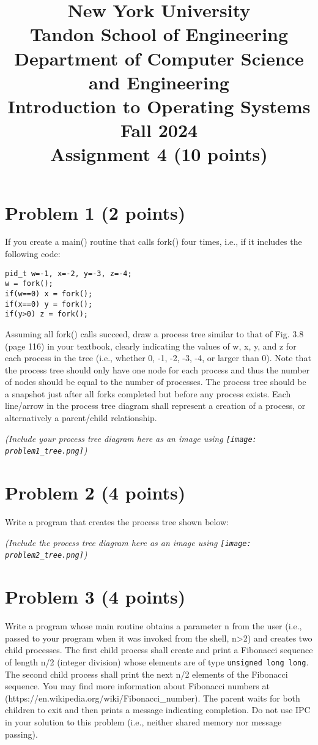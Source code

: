 \documentclass{article}
\title{New York University \\ Tandon School of Engineering \\ Department of Computer Science and Engineering \\ Introduction to Operating Systems \\ Fall 2024 \\ Assignment 4 (10 points)}
\author{ }
\date{}
\begin{document}
\maketitle

\section*{Problem 1 (2 points)}

If you create a main() routine that calls fork() four times, i.e., if it includes the following code:

\begin{verbatim}
pid_t w=-1, x=-2, y=-3, z=-4;
w = fork();
if(w==0) x = fork();
if(x==0) y = fork();
if(y>0) z = fork();
\end{verbatim}

Assuming all fork() calls succeed, draw a process tree similar to that of Fig. 3.8 (page 116) in your textbook, clearly indicating the values of w, x, y, and z for each process in the tree (i.e., whether 0, -1, -2, -3, -4, or larger than 0). Note that the process tree should only have one node for each process and thus the number of nodes should be equal to the number of processes. The process tree should be a snapshot just after all forks completed but before any process exists. Each line/arrow in the process tree diagram shall represent a creation of a process, or alternatively a parent/child relationship.

\textit{(Include your process tree diagram here as an image using \texttt{\texttt{[image: problem1\_tree.png]}})}


\section*{Problem 2 (4 points)}

Write a program that creates the process tree shown below:

\textit{(Include the process tree diagram here as an image using \texttt{\texttt{[image: problem2\_tree.png]}})}


\section*{Problem 3 (4 points)}

Write a program whose main routine obtains a parameter n from the user (i.e., passed to your program when it was invoked from the shell, n>2) and creates two child processes.  The first child process shall create and print a Fibonacci sequence of length n/2 (integer division) whose elements are of type \texttt{unsigned long long}. The second child process shall print the next n/2 elements of the Fibonacci sequence. You may find more information about Fibonacci numbers at (https://en.wikipedia.org/wiki/Fibonacci\_number). The parent waits for both children to exit and then prints a message indicating completion. Do not use IPC in your solution to this problem (i.e., neither shared memory nor message passing).
\end{document}
